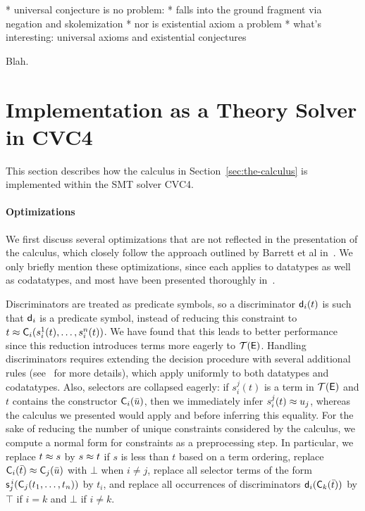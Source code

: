   * universal conjecture is no problem:
    * falls into the ground fragment via negation
      and skolemization
  * nor is existential axiom a problem
  * what's interesting: universal axioms and existential conjectures

Blah.

\section{Implementation as a Theory Solver in CVC4}
\label{sec:the-theory-solver}

This section describes how the calculus in Section~\ref{sec:the-calculus} is implemented within the SMT solver CVC4.

\paragraph{Optimizations}
We first discuss several optimizations that are not reflected in the presentation of the calculus, which closely follow the approach outlined by Barrett et al in~\cite{}.
We only briefly mention these optimizations, since each applies to datatypes as well as codatatypes, and most have been presented thoroughly in~\cite{}.

Discriminators are treated as predicate symbols, so a discriminator $\textsf{d}_i( t )$ is such that $\textsf{d}_i$ 
is a predicate symbol, instead of reducing this constraint to $t \approx \textsf{C}_i( s^1_i( t ), \ldots, s^n_i( t ) )$.
We have found that this leads to better performance since this reduction introduces terms more eagerly to $\mathcal{T}(\mathsf{E})$.
Handling discriminators requires extending the decision procedure with several additional rules (see~\cite{} for more details), which apply uniformly to both datatypes and codatatypes.
Also, selectors are collapsed eagerly:
if $s^j_i( t )$ is a term in $\mathcal{T}(\mathsf{E})$ and $t$ contains the constructor 
$\textsf{C}_i( \bar u )$, then we immediately infer $s^j_i( t ) \approx u_j$, whereas the calculus we presented would apply  and  before inferring this equality.  
For the sake of reducing the number of unique constraints considered by the calculus, we compute a normal form for constraints as a preprocessing step.
In particular, we 
replace $t \approx s$ by $s \approx t$ if $s$ is less than $t$ based on a term ordering,
replace $\textsf{C}_i( \bar t ) \approx \textsf{C}_j( \bar u )$ with $\bot$ when $i \neq j$,
replace all selector terms of the form $\textsf{s}^{\,i}_j( \textsf{C}_j(t_1,\ldots,t_n) )$ by $t_i$,
and replace all occurrences of discriminators $\textsf{d}_i( \textsf{C}_k( \bar t ) )$ by $\top$ if $i=k$ and $\bot$ if $i \neq k$.

